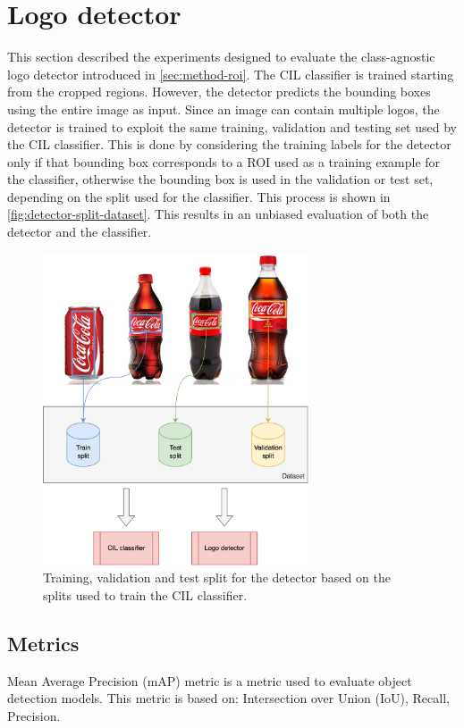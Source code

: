 \section{Logo detector}
\label{sec:exp-det}
This section described the experiments designed to evaluate the class-agnostic logo detector introduced in \autoref{sec:method-roi}.
The CIL classifier is trained starting from the cropped regions.
However, the detector predicts the bounding boxes using the entire image as input.
Since an image can contain multiple logos, the detector is trained to exploit the same training, validation and testing set used by the CIL classifier.
This is done by considering the training labels for the detector only if that bounding box corresponds to a ROI used as a training example for the classifier, otherwise the bounding box is used in the validation or test set, depending on the split used for the classifier.
This process is shown in \autoref{fig:detector-split-dataset}.
This results in an unbiased evaluation of both the detector and the classifier.

\begin{figure}[H]
	\centering
    \includegraphics[width=0.7\textwidth]{images/logos-split.drawio.png}
	\caption{Training, validation and test split for the detector based on the splits used to train the CIL classifier.}%
	\label{fig:detector-split-dataset}%
\end{figure}

\subsection{Metrics}
Mean Average Precision (mAP) metric is a metric used to evaluate object detection models. This metric is based on: Intersection over Union (IoU), Recall, Precision.

